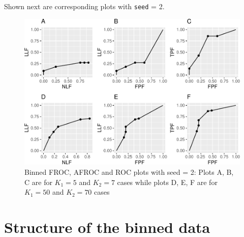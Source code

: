 \documentclass[
]{book}
\newenvironment{Shaded}{\begin{snugshade}}{\end{snugshade}}
\newcommand{\CommentTok}[1]{\textcolor[rgb]{0.56,0.35,0.01}{\textit{#1}}}
\newcommand{\KeywordTok}[1]{\textcolor[rgb]{0.13,0.29,0.53}{\textbf{#1}}}
\newcommand{\NormalTok}[1]{#1}
\newcommand{\OperatorTok}[1]{\textcolor[rgb]{0.81,0.36,0.00}{\textbf{#1}}}
\begin{document}
Shown next are corresponding plots with \texttt{seed} = 2.

\begin{figure}
\centering
\includegraphics{13b-froc-empirical2_files/figure-latex/froc-afroc-roc-binned-seed2-1.pdf}
\caption{\label{fig:froc-afroc-roc-binned-seed2}Binned FROC, AFROC and ROC plots with seed = 2: Plots A, B, C are for \(K_1 = 5\) and \(K_2 = 7\) cases while plots D, E, F are for \(K_1 = 50\) and \(K_2 = 70\) cases}
\end{figure}

\hypertarget{froc-empirical-examples-str-binned-data}{%
\section{Structure of the binned data}\label{froc-empirical-examples-str-binned-data}}

\begin{Shaded}
\end{Shaded}
\end{document}
